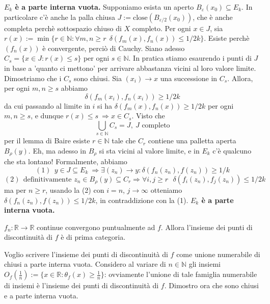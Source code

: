 \textbf{$E_k$ è a parte interna vuota.} 
Supponiamo esista un aperto $B_{\varepsilon}(x_0) \subseteq E_k$. In particolare c'è anche la palla chiusa $ J := \mathrm{close}(B_{\varepsilon/2}(x_0) ) $, che è anche completa perchè sottospazio chiuso di $X$ completo. \newline 
Per ogni $x \in J$, sia $r(x) := \min \{r \in \mathbb{N}: \forall m,n \ge r \ \ \delta(f_m(x), f_n(x) ) \le 1/2k\} $. Esiste perchè $(f_n(x))$ è convergente, perciò di Cauchy. \newline
Siano adesso $C_s = \{x \in J: r(x) \le s\}$ per ogni $s \in \mathbb{N} $. \newline
In pratica stiamo esaurendo i punti di $J$ in base a 'quanto ci mettono' per arrivare abbastanza vicini al loro valore limite. Dimostriamo che i $C_s$ sono chiusi. Sia $(x_i) \rightarrow x $ una successione in $C_s$. Allora, per ogni $m,n \ge s $ abbiamo 
$$ \delta( f_m(x_i), f_n(x_i) ) \ge 1/2k $$
da cui passando al limite in $i$ si ha $\delta( f_m(x), f_n(x) ) \ge 1/2k $ per ogni $m,n \ge s$, e dunque $r(x) \le s \ \Rightarrow x \in C_s$. Visto che
$$\bigcup_{s \in \mathbb{N}} C_s = J, \ J \text{ completo} $$
per il lemma di Baire esiste $r\in \mathbb{N}$ tale che $C_r$ contiene una palletta aperta $B_{\rho}(y)$. Eh, ma adesso in $B_{\rho}$ si sta vicini al valore limite, e in $E_k$ c'è qualcuno che sta lontano! Formalmente, abbiamo
$$ (1) \ \ y \in J \subseteq E_k \ \Rightarrow \exists (z_n) \rightarrow y: \delta( f_n(z_n), f(z_n) ) \ge 1/k  $$
$$ (2) \ \ \text{definitivamente } z_n \in B_{\rho}(y) \subseteq C_r \Rightarrow \forall i,j \ge r  \ \ \ \delta( f_i(z_n), f_j(z_n) ) \le 1/2k $$
ma per $n \ge r$, usando la (2) con $i=n$, $j \to \infty$ otteniamo \newline $\delta( f_n(z_n), f(z_n) ) \le 1/2k$, in contraddizione con la (1).
\newline
\textbf{$E_k$ è a parte interna vuota.} 

 $f_n:\mathbb R\rightarrow\mathbb R$ continue convergono puntualmente ad $f$. Allora l'insieme dei punti di discontinuità di $f$ è di prima categoria.

Voglio scrivere l'insieme dei punti di discontinuità di $f$ come unione numerabile di chiusi a parte interna vuota. Considero al variare di $n\in\mathbb N$ gli insiemi $O_f(\frac{1}{n}):=\{x\in\mathbb R : \theta_f(x)\ge\frac{1}{n}\}$: ovviamente l'unione di tale famiglia numerabile di insiemi è l'insieme dei punti di discontinuità di $f$. Dimostro ora che sono chiusi e a parte interna vuota.

